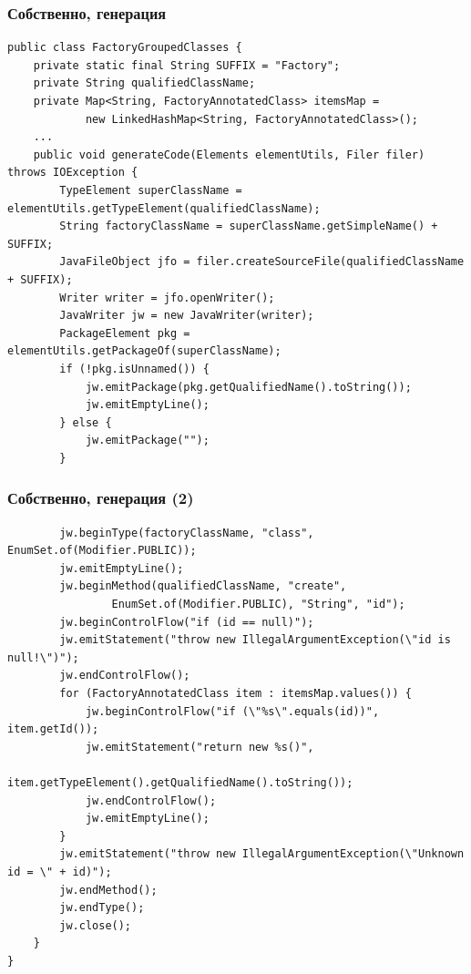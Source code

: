 \documentclass[xetex,mathserif,serif]{beamer}
\begin{document}
	\begin{frame}[fragile]
		\frametitle{Собственно, генерация}
		\begin{footnotesize}
			\begin{verbatim}
public class FactoryGroupedClasses {
    private static final String SUFFIX = "Factory";
    private String qualifiedClassName;
    private Map<String, FactoryAnnotatedClass> itemsMap =
            new LinkedHashMap<String, FactoryAnnotatedClass>();
    ...
    public void generateCode(Elements elementUtils, Filer filer) throws IOException {
        TypeElement superClassName = elementUtils.getTypeElement(qualifiedClassName);
        String factoryClassName = superClassName.getSimpleName() + SUFFIX;
        JavaFileObject jfo = filer.createSourceFile(qualifiedClassName + SUFFIX);
        Writer writer = jfo.openWriter();
        JavaWriter jw = new JavaWriter(writer);
        PackageElement pkg = elementUtils.getPackageOf(superClassName);
        if (!pkg.isUnnamed()) {
            jw.emitPackage(pkg.getQualifiedName().toString());
            jw.emitEmptyLine();
        } else {
            jw.emitPackage("");
        }
			\end{verbatim}
		\end{footnotesize}
	\end{frame}

	\begin{frame}[fragile]
		\frametitle{Собственно, генерация (2)}
		\begin{footnotesize}
			\begin{verbatim}
        jw.beginType(factoryClassName, "class", EnumSet.of(Modifier.PUBLIC));
        jw.emitEmptyLine();
        jw.beginMethod(qualifiedClassName, "create", 
                EnumSet.of(Modifier.PUBLIC), "String", "id");
        jw.beginControlFlow("if (id == null)");
        jw.emitStatement("throw new IllegalArgumentException(\"id is null!\")");
        jw.endControlFlow();
        for (FactoryAnnotatedClass item : itemsMap.values()) {
            jw.beginControlFlow("if (\"%s\".equals(id))", item.getId());
            jw.emitStatement("return new %s()", 
                    item.getTypeElement().getQualifiedName().toString());
            jw.endControlFlow();
            jw.emitEmptyLine();
        }
        jw.emitStatement("throw new IllegalArgumentException(\"Unknown id = \" + id)");
        jw.endMethod();
        jw.endType();
        jw.close();
    }
}
			\end{verbatim}
		\end{footnotesize}
	\end{frame}
\end{document}
